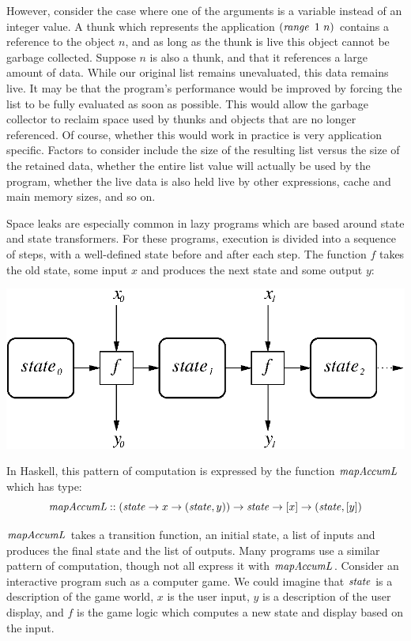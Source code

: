 However, consider the case where one of the arguments is a variable instead of an integer value. A thunk which represents the application $(\operatorname{\mathit{range}} \ 1 \ n)$ contains a reference to the object $n$, and as long as the thunk is live this object cannot be garbage collected. Suppose $n$ is also a thunk, and that it references a large amount of data. While our original list remains unevaluated, this data remains live. It may be that the program's performance would be improved by forcing the list to be fully evaluated as soon as possible. This would allow the garbage collector to reclaim space used by thunks and objects that are no longer referenced. Of course, whether this would work in practice is very application specific. Factors to consider include the size of the resulting list versus the size of the retained data, whether the entire list value will actually be used by the program, whether the live data is also held live by other expressions, cache and main memory sizes, and so on.

Space leaks are especially common in lazy programs which are based around state and state transformers. For these programs, execution is divided into a sequence of steps, with a well-defined state before and after each step. The function $f$ takes the old state, some input $x$ and produces the next state and some output $y$:

\begin{center}
\includegraphics[scale=0.8]{1-Introduction/fig/lazy/space-leak}
\end{center}

\clearpage{}
In Haskell, this pattern of computation is expressed by the function $\operatorname{\mathit{mapAccumL}}$ which has type:
$$\operatorname{\mathit{mapAccumL}} :: (\operatorname{\mathit{state}} \to x \to (\operatorname{\mathit{state}}, y)) \to \operatorname{\mathit{state}} \to [x] \to (\operatorname{\mathit{state}}, [y])$$

$\operatorname{\mathit{mapAccumL}}$ takes a transition function, an initial state, a list of inputs and produces the final state and the list of outputs. Many programs use a similar pattern of computation, though not all express it with $\operatorname{\mathit{mapAccumL}}$. Consider an interactive program such as a computer game. We could imagine that $\operatorname{\mathit{state}}$ is a description of the game world, $x$ is the user input, $y$ is a description of the user display, and $f$ is the game logic which computes a new state and display based on the input.

